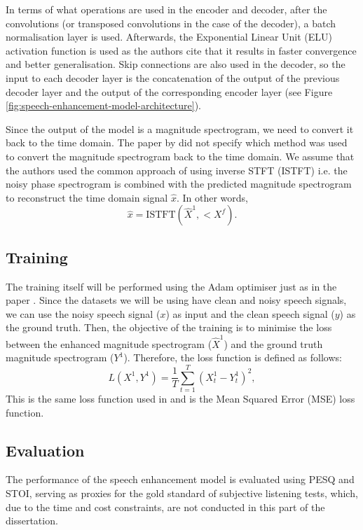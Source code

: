 \documentclass[logo,bsc,singlespacing,parskip,online]{infthesis}
\begin{document}
In terms of what operations are used in the encoder and decoder, after the convolutions (or transposed convolutions in the case of the decoder),
a batch normalisation layer is used. Afterwards, the Exponential Linear Unit (ELU) activation function is used 
as the authors cite that it results in faster convergence and better generalisation. Skip connections 
are also used in the decoder, so the input to each decoder layer is the concatenation of the output of the previous decoder layer 
and the output of the corresponding encoder layer (see Figure \ref{fig:speech-enhancement-model-architecture}).

Since the output of the model is a magnitude spectrogram, we need to convert it back to the time domain. 
The paper by \citet{tan18_interspeech} did not specify which method was used to convert the magnitude spectrogram back to the time domain.
We assume that the authors used the common approach of using inverse STFT (ISTFT) \citep{xu_regression_2015} i.e. the noisy phase spectrogram 
is combined with the predicted magnitude spectrogram to reconstruct the time domain signal $\hat{x}$. In other words,
\[
\hat{x} = \text{ISTFT}(\hat{X}^{1}, <X^{f}).
\]
\subsection{Training}
The training itself will be performed using the Adam optimiser just as in the paper \citep{tan18_interspeech}.
Since the datasets we will be using have clean and noisy speech signals, we can use the noisy speech signal ($x$) as input
and the clean speech signal ($y$) as the ground truth.
Then, the objective of the training is to minimise the loss between the enhanced magnitude spectrogram ($\hat{X}^{1}$) 
and the ground truth magnitude spectrogram ($Y^{1}$).
Therefore, the loss function is defined as follows:
\[
L(X^{1}, Y^{1}) = \frac{1}{T} \sum_{t=1}^{T} (X^{1}_t - Y^{1}_t)^2,
\]
This is the same loss function used in \citet{tan18_interspeech} and is the Mean Squared Error (MSE) loss function.

\subsection{Evaluation}
The performance of the speech enhancement model is evaluated using PESQ and STOI,
serving as proxies for the gold standard of subjective listening tests, which, 
due to the time and cost constraints, are not conducted in this part of the dissertation.
\end{document}

